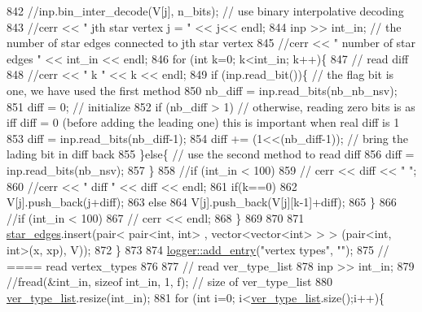 \begin{DoxyCode}
842       \textcolor{comment}{//inp.bin\_inter\_decode(V[j], n\_bits); // use binary interpolative decoding}
843       \textcolor{comment}{//cerr << "  jth star vertex j = " << j<< endl; }
844       inp >> int\_in; \textcolor{comment}{// the number of star edges connected to jth star vertex}
845       \textcolor{comment}{//cerr << " number of star edges " << int\_in << endl;}
846       \textcolor{keywordflow}{for} (\textcolor{keywordtype}{int} k=0; k<int\_in; k++)\{
847         \textcolor{comment}{// read diff}
848         \textcolor{comment}{//cerr << " k " << k << endl;}
849         \textcolor{keywordflow}{if} (inp.read\_bit())\{ \textcolor{comment}{// the flag bit is one, we have used the first method }
850           nb\_diff = inp.read\_bits(nb\_nb\_nsv);
851           diff = 0; \textcolor{comment}{// initialize}
852           \textcolor{keywordflow}{if} (nb\_diff > 1) \textcolor{comment}{// otherwise, reading zero bits is as iff diff = 0 (before adding the leading
       one) this is important when real diff is 1}
853             diff = inp.read\_bits(nb\_diff-1);
854           diff += (1<<(nb\_diff-1)); \textcolor{comment}{// bring the lading bit in diff back }
855         \}\textcolor{keywordflow}{else}\{ \textcolor{comment}{// use the second method to read diff}
856           diff = inp.read\_bits(nb\_nsv);
857         \}
858         \textcolor{comment}{//if (int\_in < 100)}
859         \textcolor{comment}{//  cerr << diff << " ";}
860         \textcolor{comment}{//cerr << " diff " << diff << endl;}
861         \textcolor{keywordflow}{if}(k==0)
862           V[j].push\_back(j+diff);
863         \textcolor{keywordflow}{else}
864           V[j].push\_back(V[j][k-1]+diff);
865       \}
866       \textcolor{comment}{//if (int\_in < 100)}
867       \textcolor{comment}{//  cerr << endl;}
868     \}
869 
870 
871     \hyperlink{classmarked__graph__compressed_a7df5779d313486644132bd816937f532}{star\_edges}.insert(pair< pair<int, int> , vector<vector<int> > > (pair<int, int>(x, xp), V));
872   \}
873 
874   \hyperlink{classlogger_a710163deb17bc81f70d53d285b8ac9ac}{logger::add\_entry}(\textcolor{stringliteral}{"vertex types"}, \textcolor{stringliteral}{""});
875   \textcolor{comment}{// ==== read vertex\_types}
876 
877   \textcolor{comment}{// read ver\_type\_list}
878   inp >> int\_in;
879   \textcolor{comment}{//fread(&int\_in, sizeof int\_in, 1, f); // size of ver\_type\_list}
880   \hyperlink{classmarked__graph__compressed_af2e3e55223d436628a02758dfae88493}{ver\_type\_list}.resize(int\_in);
881   \textcolor{keywordflow}{for} (\textcolor{keywordtype}{int} i=0; i<\hyperlink{classmarked__graph__compressed_af2e3e55223d436628a02758dfae88493}{ver\_type\_list}.size();i++)\{

\end{DoxyCode}
